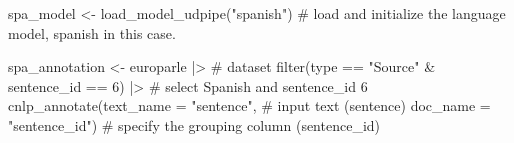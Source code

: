 \documentclass[
  letterpaper,
]{latex/krantz}
\newenvironment{Shaded}{\begin{snugshade}}{\end{snugshade}}
\newcommand{\AttributeTok}[1]{\textcolor[rgb]{0.40,0.45,0.13}{#1}}
\newcommand{\CommentTok}[1]{\textcolor[rgb]{0.37,0.37,0.37}{#1}}
\newcommand{\DecValTok}[1]{\textcolor[rgb]{0.68,0.00,0.00}{#1}}
\newcommand{\FunctionTok}[1]{\textcolor[rgb]{0.28,0.35,0.67}{#1}}
\newcommand{\NormalTok}[1]{\textcolor[rgb]{0.00,0.23,0.31}{#1}}
\newcommand{\OtherTok}[1]{\textcolor[rgb]{0.00,0.23,0.31}{#1}}
\newcommand{\SpecialCharTok}[1]{\textcolor[rgb]{0.37,0.37,0.37}{#1}}
\newcommand{\StringTok}[1]{\textcolor[rgb]{0.13,0.47,0.30}{#1}}
\begin{document}
\begin{Shaded}
\begin{Highlighting}[]
\NormalTok{spa\_model }\OtherTok{\textless{}{-}} \FunctionTok{load\_model\_udpipe}\NormalTok{(}\StringTok{"spanish"}\NormalTok{) }\CommentTok{\# load and initialize the language model, \textquotesingle{}spanish\textquotesingle{} in this case.}

\NormalTok{spa\_annotation }\OtherTok{\textless{}{-}} 
\NormalTok{  europarle }\SpecialCharTok{|\textgreater{}} \CommentTok{\# dataset }
  \FunctionTok{filter}\NormalTok{(type }\SpecialCharTok{==} \StringTok{"Source"} \SpecialCharTok{\&}\NormalTok{ sentence\_id }\SpecialCharTok{==} \DecValTok{6}\NormalTok{) }\SpecialCharTok{|\textgreater{}} \CommentTok{\# select Spanish and sentence\_id 6}
  \FunctionTok{cnlp\_annotate}\NormalTok{(}\AttributeTok{text\_name =} \StringTok{"sentence"}\NormalTok{, }\CommentTok{\# input text (sentence)}
                \AttributeTok{doc\_name =} \StringTok{"sentence\_id"}\NormalTok{) }\CommentTok{\# specify the grouping column (sentence\_id)}
\end{Highlighting}
\end{Shaded}
\end{document}
